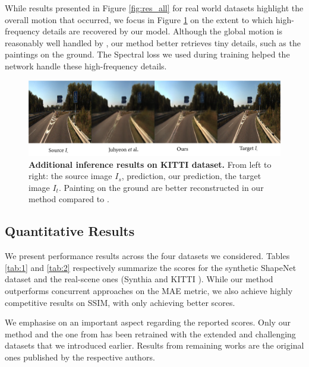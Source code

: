 While results presented in Figure \ref{fig:res_all} for real world datasets highlight the overall motion that occurred, we focus in Figure \ref{fig:res_all2} on the extent to which high-frequency details are recovered by our model. Although the global motion is reasonably well handled by \citep{kim2020novel}, our method better retrieves tiny details, such as the paintings on the ground. The Spectral loss we used during training helped the network handle these high-frequency details. 

\begin{figure}[h!]
    \begin{center}
    \includegraphics[width=\textwidth]{images/epipolarnvs/rebbutal_KITTI_3_New.png}
    \end{center}
     \caption{\textbf{Additional inference results on KITTI dataset.} From left to right: the source image  $I_s$, \citep{kim2020novel} prediction, our prediction, the target image $I_t$. Painting on the ground are better reconstructed in our method compared to \citep{kim2020novel}.}
     \label{fig:res_all2}
\end{figure}

  
\subsection{Quantitative Results}

We present performance results across the four datasets we considered. Tables \ref{tab:1} and \ref{tab:2} respectively summarize the scores for the synthetic ShapeNet \citep{chang2015shapenet} dataset and the real-scene ones (Synthia \citep{ros2016synthia} and KITTI \citep{geiger2012we}). While our method outperforms concurrent approaches on the \ac{MAE} metric, we also achieve highly competitive results on SSIM, with only \citep{sun2018multiview} achieving better scores. \newline

We emphasise on an important aspect regarding the reported scores. Only our method and the one from \citep{kim2020novel} has been retrained with the extended and challenging datasets that we introduced earlier. Results from remaining works \citep{tatarchenko2015single,zhou2016view,park2017transformation,sun2018multiview,} are the original ones published by the respective authors. 

